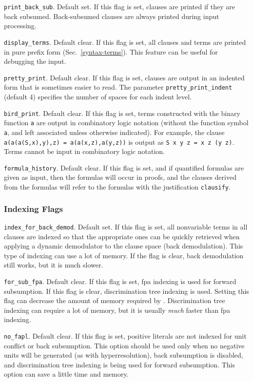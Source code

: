 \documentclass[11pt]{article}
\begin{document}
\noindent
\verb:print_back_sub:.  Default set.  If this flag is set,
clauses are printed if they are back subsumed.
Back-subsumed clauses are always printed during input processing.

\noindent
\verb:display_terms:.  Default clear.  If this flag is set, all
clauses and terms are printed in pure prefix form (Sec.~\ref{syntax-terms}).
This feature can be useful for debugging the input.

\noindent
\verb:pretty_print:.  Default clear.  If this flag is set, clauses
are output in an indented form that is sometimes easier to read.
The parameter \verb:pretty_print_indent: (default 4) specifies the
number of spaces for each indent level.

\noindent
\verb:bird_print:.  Default clear.  If this flag is set,
terms constructed with the binary function \verb:a: are output in combinatory
logic notation (without the function symbol \verb:a:, and left
associated unless otherwise indicated).  For example, the clause
\verb:a(a(a(S,x),y),z) = a(a(x,z),a(y,z)): is output as
\verb:S x y z = x z (y z):.
Terms cannot be input in combinatory logic notation.

\noindent
\verb:formula_history:.  Default clear.
If this flag is set, and if quantified formulas are given as input,
then the formulas will occur in proofs, and the clauses derived
from the formulas will refer to the formulas with the justification
\verb:clausify:.

\subsubsection{Indexing Flags} \label{index-flags}

\verb:index_for_back_demod:.  Default set.  If this flag is set,
all nonvariable terms in all clauses are indexed so that
the appropriate ones can be quickly retrieved when applying a
dynamic demodulator to the clause space (back demodulation).  This
type of indexing can use a lot of memory.  If the flag is clear,
back demodulation still works, but it is much slower.

\noindent
\verb:for_sub_fpa:.  Default clear.  If this flag is set,
{\sc fpa} indexing is used for forward subsumption.  If this flag is
clear, discrimination tree indexing is used.  Setting this
flag can decrease the amount of memory required by \otter.
Discrimination tree indexing can require a lot of memory, but it is
usually {\em much} faster than {\sc fpa} indexing.

\noindent
\verb:no_fapl:.  Default clear.  If this flag is set, 
positive literals are not indexed for unit conflict or back
subsumption.  This option should be used only when no negative units will be
generated (as with hyperresolution), back subsumption is disabled, and
discrimination tree indexing is being used for forward subsumption.
This option can save a little time and memory.
\end{document}
